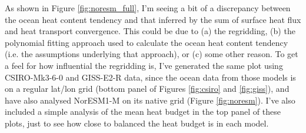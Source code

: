 As shown in Figure \ref{fig:noresm_full}, I'm seeing a bit of a discrepancy between the ocean heat content tendency and that inferred by the sum of surface heat flux and heat transport convergence. This could be due to (a) the regridding, (b) the polynomial fitting approach used to calculate the ocean heat content tendency (i.e. the assumptions underlying that approach), or (c) some other reason. To get a feel for how influential the regridding is, I've generated the same plot using CSIRO-Mk3-6-0 and GISS-E2-R data, since the ocean data from those models is on a regular lat/lon grid (bottom panel of Figures \ref{fig:csiro} and \ref{fig:giss}), and have also analysed NorESM1-M on its native grid (Figure \ref{fig:noresm}). I've also included a simple analysis of the mean heat budget in the top panel of these plots, just to see how close to balanced the heat budget is in each model.